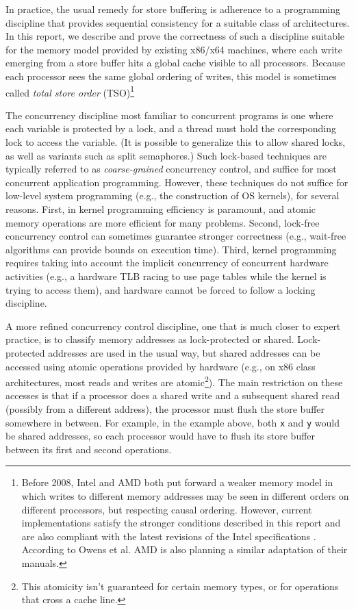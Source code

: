 \documentclass[11pt]{llncs}
\newcommand{\eg}{e.g.,\xspace}
\newcommand{\Def}[1]{\emph{#1}}
\begin{document}
In practice, the usual remedy for store buffering is adherence to a
programming discipline that provides sequential consistency for a
suitable class of architectures. In this report, we describe and prove
the correctness of such a discipline suitable for the memory model
provided by existing x86/x64 machines, where each write emerging from
a store buffer hits a global cache visible to all processors. Because
each processor sees the same global ordering of writes, this model is
sometimes called \Def{total store order}
(TSO)\cite{Adve:Computer-29-12-66}\footnote{Before 2008, Intel
\cite{IntelWhitePaper} and AMD \cite{AMD:AMD64A2006-ALL} both put
forward a weaker memory model in which writes to different memory
addresses may be seen in different orders on different processors, but
respecting causal ordering. However, current implementations satisfy
the stronger conditions described in this report and are also
compliant with the latest revisions of the Intel specifications
\cite{Intel:IIA2006-ALL}. According to Owens et
al. \cite{Owens:TPHOL09-?} AMD is also planning a similar adaptation
of their manuals.}

The concurrency discipline most familiar to concurrent programs is one
where each variable is protected by a lock, and a thread must hold the
corresponding lock to access the variable. (It is possible to
generalize this to allow shared locks, as well as variants such as
split semaphores.) Such lock-based techniques are typically referred
to as \Def{coarse-grained} concurrency control, and suffice for most
concurrent application programming. However, these techniques do not
suffice for low-level system programming (\eg the construction of OS
kernels), for several reasons. First, in kernel programming efficiency
is paramount, and atomic memory operations are more efficient for many
problems. Second, lock-free concurrency control can sometimes
guarantee stronger correctness (\eg wait-free algorithms can provide
bounds on execution time). Third, kernel programming requires taking
into account the implicit concurrency of concurrent hardware
activities (\eg a hardware TLB racing to use page tables while the
kernel is trying to access them), and hardware cannot be forced to
follow a locking discipline.

A more refined concurrency control discipline, one that is much closer
to expert practice, is to classify memory addresses as lock-protected
or shared. Lock-protected addresses are used in the usual way, but
shared addresses can be accessed using atomic operations provided by
hardware (e.g., on x86 class architectures, most reads and writes are
atomic\footnote{This atomicity isn't guaranteed for certain memory types,
  or for operations that cross a cache line.}). The main restriction
on these accesses is that if a processor does a shared write and a subsequent
shared read (possibly from a different address), the processor must
flush the store buffer somewhere in between. For example, in the
example above, both \texttt{x} and \texttt{y} would be shared
addresses, so each processor would have to flush its store buffer
between its first and second operations.
\end{document}
